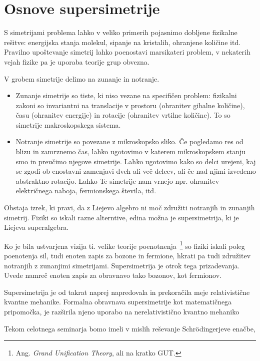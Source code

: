 \section{Osnove supersimetrije}

S simetrijami problema lahko v veliko primerih pojasnimo dobljene fizikalne re\v sitve: energijska stanja molekul,
sipanje na kristalih, ohranjene koli\v cine itd. Pravilno upo\v stevanje simetrij lahko poenostavi marsikateri problem,
v nekaterih vejah fizike pa je uporaba teorije grup obvezna.

V grobem simetrije delimo na zunanje in notranje.
\begin{itemize}
	\item{Zunanje simetrije so tiste, ki niso vezane na specifi\v cen problem: fizikalni zakoni so invariantni
		na translacije v prostoru (ohranitev gibalne koli\v cine), \v casu (ohranitev energije) in rotacije
		(ohranitev vrtilne koli\v cine). To so simetrije makroskopskega sistema.}
	\item{Notranje simetrije so povezane z mikroskopsko sliko. \v Ce pogledamo res od blizu in zamrznemo
		\v cas, lahko ugotovimo v katerem mikroskopskem stanju smo in preu\v cimo njegove simetrije. Lahko ugotovimo
		kako so delci urejeni, kaj se zgodi ob enostavni zamenjavi dveh ali ve\v c delcev, ali \v ce nad njimi
		izvedemo abstraktno rotacijo. Lahko Te simetrije nam vrnejo npr. ohranitev elektri\v cnega naboja, fermionskega
		\v stevila, itd.}
\end{itemize}

Obstaja izrek, ki pravi, da z Liejevo algebro ni mo\v c zdru\v ziti notranjih in zunanjih simetrij. Fiziki so iskali
razne alterntive, edina mo\v zna je supersimetrija, ki je Liejeva superalgebra.

\ni Ko je bila ustvarjena vizija ti. velike teorije poenotnenja~\footnote{Ang. \emph{Grand Unification Theory}, ali na kratko GUT.}
so fiziki iskali poleg poenotenja sil, tudi enoten zapis za bozone in fermione, hkrati pa tudi zdru\v zitev notranjih
z zunanjimi simetrijami. Supersimetrija je otrok tega prizadevanja. Uvede namre\v c enoten zapis za obravnavo tako bozonov,
kot fermionov.

Supersimetrija je od takrat naprej napredovala in prekora\v cila meje relativisti\v cne kvantne mehanike. Formalna obravnava
supersimetrije kot matemati\v cnega pripomo\v cka, je raz\v sirila njeno uporabo na nerelativisti\v cno kvantno mehaniko

Tekom celotnega seminarja bomo imeli v mislih re\v sevanje Schr\" odingerjeve ena\v cbe,

